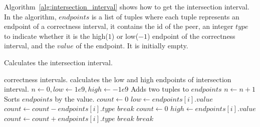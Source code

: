 Algorithm~\ref{alg:intersection_interval} shows how to get the intersection
interval.  In the algorithm, $endpoints$ is a list of tuples where each tuple
represents an endpoint of a correctness interval, it contains the id of the
peer, an integer $type$ to indicate whether it is the high($1$) or low($-1$)
endpoint of the correctness interval, and the $value$ of the endpoint. It is
initially empty.

\begin{algorithm}[!t]
    \centering
    \small
    \caption{Calculates the intersection interval.}
    \begin{algorithmic}[1]
        \REQUIRE
            correctness intervals.
        \ENSURE
            calculates the low and high endpoints of intersection interval.
        \STATE
        \STATE
            $n \leftarrow 0, low \leftarrow 1e9, high \leftarrow -1e9$
            \STATE
            Adds two tuples to $endpoints$
            \STATE
            $n \leftarrow n + 1$
        \ENDFOR
        \STATE
            Sorts $endpoints$ by the value.
        \STATE
        \STATE
            \STATE
            \STATE
            $count \leftarrow 0$
                \STATE
                $low \leftarrow endpoints[i].value$
                \STATE
                $count \leftarrow count - endpoints[i].type$
                \STATE
                    $break$
                \ENDIF
            \ENDFOR
            \STATE
            \STATE
            \STATE
            $count \leftarrow 0$
                \STATE
                $high \leftarrow endpoints[i].value$
                \STATE
                $count \leftarrow count + endpoints[i].type$
                    \STATE
                    $break$
                \ENDIF
            \ENDFOR
            \STATE
            \STATE
                \STATE
                $break$
            \ENDIF
        \ENDFOR
    \end{algorithmic}
\label{alg:intersection_interval}
\end{algorithm}

